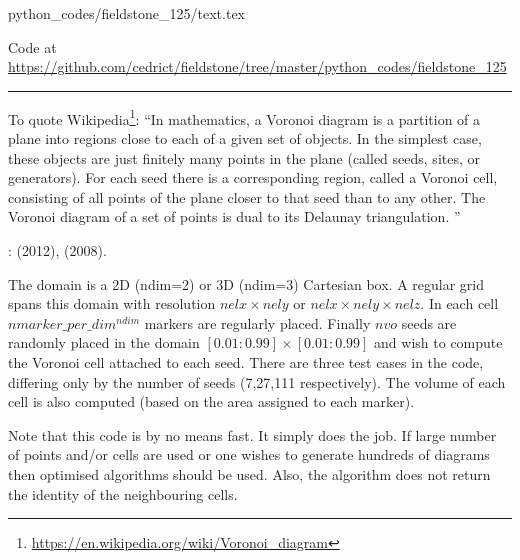 \begin{flushright} {\tiny {\color{gray} python\_codes/fieldstone\_125/text.tex}} \end{flushright}

%

\begin{center}

Code at \url{https://github.com/cedrict/fieldstone/tree/master/python_codes/fieldstone_125}
\end{center}

\par\noindent\rule{\textwidth}{0.4pt}



To quote Wikipedia\footnote{\url{https://en.wikipedia.org/wiki/Voronoi_diagram}}:
``In mathematics, a Voronoi diagram is a partition of a plane into regions close to 
each of a given set of objects. In the simplest case, these objects are just finitely 
many points in the plane (called seeds, sites, or generators). 
For each seed there is a corresponding region, called a Voronoi cell, consisting of 
all points of the plane closer to that seed than to any other. The Voronoi diagram 
of a set of points is dual to its Delaunay triangulation. ''

\Literature: \textcite{may12} (2012), \textcite{hust08b} (2008).

The domain is a 2D ({\python ndim=2}) or 3D ({\python ndim=3}) 
Cartesian box. A regular grid spans this domain with resolution 
$nelx \times nely$ or $nelx \times nely \times nelz$. 
In each cell $nmarker\_per\_dim^{ndim}$ markers are regularly placed. 
Finally $nvo$ seeds are randomly placed in the domain $[0.01:0.99]\times[0.01:0.99]$ 
and wish to compute the Voronoi cell attached to 
each seed. There are three test cases in the code, differing only by the number of seeds (7,27,111 respectively).
The volume of each cell is also computed (based on the area assigned to each marker).

Note that this code is by no means fast. It simply does the job. If large number of points and/or cells are 
used or one wishes to generate hundreds of diagrams then optimised algorithms should be used. 
Also, the algorithm does not return the identity of the neighbouring cells.

